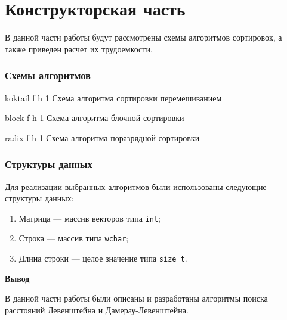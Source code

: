\chapter{Конструкторская часть}
В данной части работы будут рассмотрены схемы алгоритмов сортировок, а также приведен расчет их трудоемкости.





\subsection{Схемы алгоритмов}
{koktail} %
{f} %
{h} %
{1\textwidth} %
{Схема алгоритма сортировки перемешиванием} %



{block} %
{f} %
{h} %
{1\textwidth} %
{Схема алгоритма блочной сортировки} %


{radix} %
{f} %
{h} %
{1\textwidth} %
{Схема алгоритма поразрядной сортировки} %




\subsection{Структуры данных}
Для реализации выбранных алгоритмов были использованы следующие структуры данных:
\begin{enumerate}
	\item Матрица --- массив векторов типа \texttt{int};
	\item Строка --- массив типа \texttt{wchar};
	\item Длина строки --- целое значение типа \texttt{size\_t}.
\end{enumerate}


\textbf{Вывод}

В данной части работы были описаны и разработаны алгоритмы  поиска расстояний Левенштейна и Дамерау-Левенштейна.









